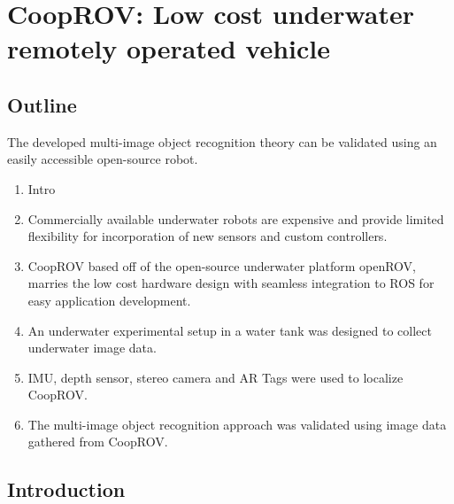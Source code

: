\documentclass {udthesis}
\begin{document}

\chapter{CoopROV: Low cost underwater remotely operated vehicle}
\label{chap:cooprov}

\section{Outline}

The developed multi-image object recognition theory can be validated using an easily accessible 
open-source robot.

\begin{enumerate}[label=Section \arabic*:, start=0]
\item Intro

\item Commercially available underwater robots are expensive and provide limited flexibility for incorporation of new sensors and custom controllers.

\item CoopROV based off of the open-source underwater platform openROV, marries the low cost hardware design with seamless integration to ROS for easy application development.

\item An underwater experimental setup in a water tank was designed to collect underwater image data.

\item IMU, depth sensor, stereo camera and AR Tags were used to localize CoopROV.

\item The multi-image object recognition approach was validated using image data gathered from CoopROV.

\end{enumerate}


\section{Introduction}
\end{document}
